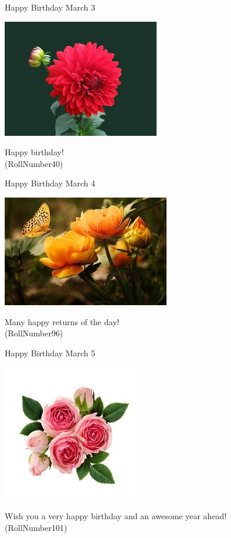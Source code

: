 \documentclass[table, landscape]{beamer}
\begin{document}
\begin{frame}{\color{blue}Happy Birthday }
{March 3}
\begin{center}
\includegraphics[height=0.5\textheight]{flowers/f1.jpeg}

Happy birthday! \\ \vspace{0.5cm}{\Large name33} (RollNumber40)
\end{center}
\end{frame}
\begin{frame}{\color{red}Happy Birthday }
{March 4}
\begin{center}
\includegraphics[height=0.5\textheight]{flowers/f7.jpeg}

Many happy returns of the day! \\ \vspace{0.5cm}{\Large name89} (RollNumber96)
\end{center}
\end{frame}
\begin{frame}{\color{blue}Happy Birthday }
{March 5}
\begin{center}
\includegraphics[height=0.5\textheight]{flowers/f5.jpeg}

Wish you a very happy birthday and an awesome year ahead! \\ \vspace{0.5cm}{\Large name94} (RollNumber101)
\end{center}
\end{frame}
\end{document}
